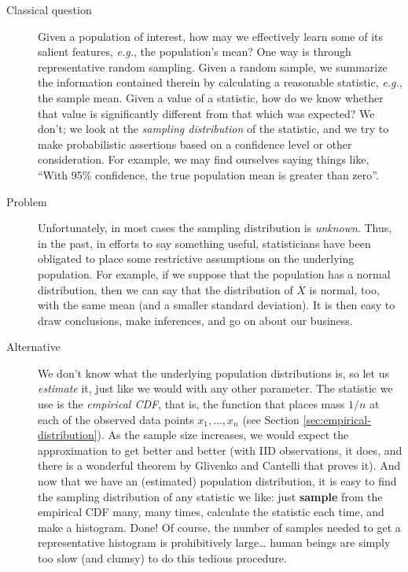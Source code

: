\documentclass[captions=tableheading]{scrbook}
\begin{document}
\label{sec:Introduction-Resampling}

\begin{description}
\item[Classical question] Given a population of interest, how may we effectively learn some of its salient features, \emph{e.g.}, the population's mean? One way is through representative random sampling. Given a random sample, we summarize the information contained therein by calculating a reasonable statistic, \emph{e.g.}, the sample mean. Given a value of a statistic, how do we know whether that value is significantly different from that which was expected? We don't; we look at the \emph{sampling distribution} of the statistic, and we try to make probabilistic assertions based on a confidence level or other consideration. For example, we may find ourselves saying things like, ``With 95\% confidence, the true population mean is greater than zero''.
\item[Problem] Unfortunately, in most cases the sampling distribution is \emph{unknown}. Thus, in the past, in efforts to say something useful, statisticians have been obligated to place some restrictive assumptions on the underlying population. For example, if we suppose that the population has a normal distribution, then we can say that the distribution of \(\overline{X}\) is normal, too, with the same mean (and a smaller standard deviation). It is then easy to draw conclusions, make inferences, and go on about our business.
\item[Alternative] We don't know what the underlying population distributions is, so let us \emph{estimate} it, just like we would with any other parameter. The statistic we use is the \emph{empirical CDF}, that is, the function that places mass \(1/n\) at each of the observed data points \(x_{1},\ldots,x_{n}\) (see Section \ref{sec:empirical-distribution}). As the sample size increases, we would expect the approximation to get better and better (with IID observations, it does, and there is a wonderful theorem by Glivenko and Cantelli that proves it). And now that we have an (estimated) population distribution, it is easy to find the sampling distribution of any statistic we like: just \textbf{sample} from the empirical CDF many, many times, calculate the statistic each time, and make a histogram. Done! Of course, the number of samples needed to get a representative histogram is prohibitively large\ldots{} human beings are simply too slow (and clumsy) to do this tedious procedure.
\end{description}
\end{document}
